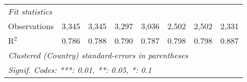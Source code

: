 \begin{tabular}{lccccccc}
   \midrule \emph{Fit statistics}\\
   Observations                                                    & 3,345         & 3,345         & 3,297        & 3,036       & 2,502         & 2,502         & 2,331\\  
   R$^2$                                                           & 0.786         & 0.788         & 0.790        & 0.787       & 0.798         & 0.798         & 0.887\\  
   \midrule
   \multicolumn{8}{l}{\emph{Clustered (Country) standard-errors in parentheses}}\\
   \multicolumn{8}{l}{\emph{Signif. Codes: ***: 0.01, **: 0.05, *: 0.1}}\\
\end{tabular}
\par\endgroup


